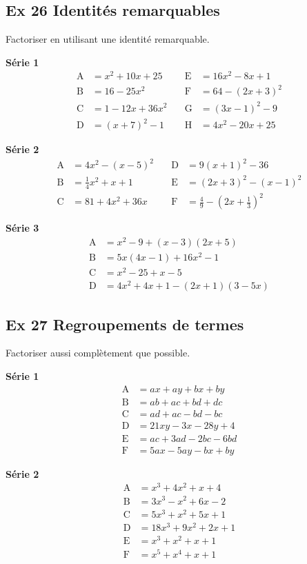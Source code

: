 \documentclass[a4paper,11pt]{article}
\begin{document}
\subsection*{Ex 26 \; Identités remarquables}
Factoriser en utilisant une identité remarquable.

\textbf{Série 1}
\[
\begin{aligned}
\mathrm{A}&=x^{2}+10x+25 &\quad \mathrm{E}&=16x^{2}-8x+1\\
\mathrm{B}&=16-25x^{2} &\quad \mathrm{F}&=64-(2x+3)^{2}\\
\mathrm{C}&=1-12x+36x^{2} &\quad \mathrm{G}&=(3x-1)^{2}-9\\
\mathrm{D}&=(x+7)^{2}-1 &\quad \mathrm{H}&=4x^{2}-20x+25
\end{aligned}
\]

\textbf{Série 2}
\[
\begin{aligned}
\mathrm{A}&=4x^{2}-(x-5)^{2} &\quad \mathrm{D}&=9(x+1)^{2}-36\\
\mathrm{B}&=\tfrac14 x^{2}+x+1 &\quad \mathrm{E}&=(2x+3)^{2}-(x-1)^{2}\\
\mathrm{C}&=81+4x^{2}+36x &\quad \mathrm{F}&=\tfrac{4}{9}-\left(2x+\tfrac13\right)^{2}
\end{aligned}
\]

\textbf{Série 3}
\[
\begin{aligned}
\mathrm{A}&=x^{2}-9+(x-3)(2x+5)\\
\mathrm{B}&=5x(4x-1)+16x^{2}-1\\
\mathrm{C}&=x^{2}-25+x-5\\
\mathrm{D}&=4x^{2}+4x+1-(2x+1)(3-5x)
\end{aligned}
\]

\subsection*{Ex 27 \; Regroupements de termes}
Factoriser aussi complètement que possible.

\textbf{Série 1}
\[
\begin{aligned}
\mathrm{A}&=ax+ay+bx+by\\
\mathrm{B}&=ab+ac+bd+dc\\
\mathrm{C}&=ad+ac-bd-bc\\
\mathrm{D}&=21xy-3x-28y+4\\
\mathrm{E}&=ac+3ad-2bc-6bd\\
\mathrm{F}&=5ax-5ay-bx+by
\end{aligned}
\]

\textbf{Série 2}
\[
\begin{aligned}
\mathrm{A}&=x^{3}+4x^{2}+x+4\\
\mathrm{B}&=3x^{3}-x^{2}+6x-2\\
\mathrm{C}&=5x^{3}+x^{2}+5x+1\\
\mathrm{D}&=18x^{3}+9x^{2}+2x+1\\
\mathrm{E}&=x^{3}+x^{2}+x+1\\
\mathrm{F}&=x^{5}+x^{4}+x+1
\end{aligned}
\]
\end{document}
